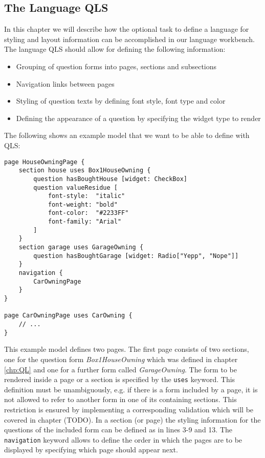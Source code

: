 \subsection{The Language QLS}

In this chapter we will describe how the optional task to define a language 
for styling and layout information can be accomplished in our language workbench.
The language QLS should allow for defining the following information:
\begin{itemize}
  \item Grouping of question forms into pages, sections and subsections
  \item Navigation links between pages
  \item Styling of question texts by defining font style, font type and color
  \item Defining the appearance of a question by specifying the widget type to render
\end{itemize}

The following shows an example model that we want to be able to define with QLS:

\begin{lstlisting}[language=QLS]
page HouseOwningPage {
	section house uses Box1HouseOwning {
		question hasBoughtHouse [widget: CheckBox]
		question valueResidue [
			font-style:  "italic"
			font-weight: "bold" 
			font-color:  "#2233FF"
			font-family: "Arial"
		]
	}
	section garage uses GarageOwning {
		question hasBoughtGarage [widget: Radio["Yepp", "Nope"]]		
	}
	navigation {
		CarOwningPage
	}
}

page CarOwningPage uses CarOwning {
	// ...
}
\end{lstlisting}

This example model defines two pages. The first page consists of two sections,
one for the question form \emph{Box1HouseOwning} which was defined in chapter 
\ref{chp:QL} and one for a further form called \emph{GarageOwning}. The form to
be rendered inside a page or a section is specified by the \texttt{uses} keyword.
This definition must be unambiguously, e.g. if there is a form included by a page,
it is not allowed to refer to another form in one of its containing sections.
This restriction is ensured by implementing a corresponding validation which will be covered
in chapter (TODO). In a section (or page) the styling information for the questions of the included
form can be defined as in lines 3-9 and 13. The \texttt{navigation} keyword allows to define the order in which the pages are to
be displayed by specifying which page should appear next.


